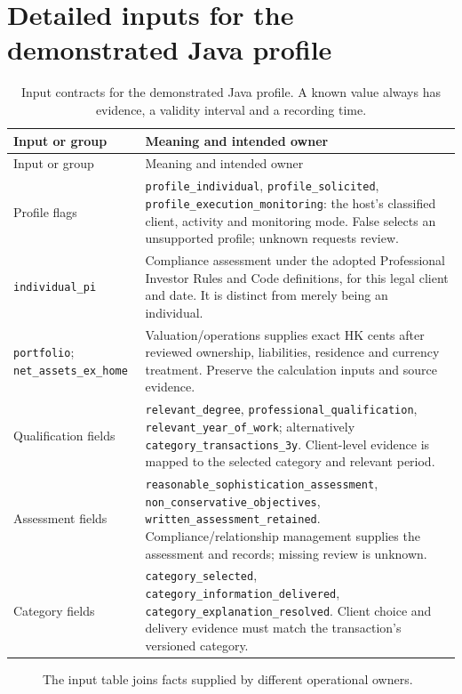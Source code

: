 \section{Detailed inputs for the demonstrated Java profile}
\begingroup\small
\begin{longtable}{P{0.30\textwidth}P{0.60\textwidth}}
\caption{Input contracts for the demonstrated Java profile. A known value always
has evidence, a validity interval and a recording time.}\label{tab:demo-inputs}\\
\toprule Input or group & Meaning and intended owner \\\midrule
\endfirsthead
\toprule Input or group & Meaning and intended owner \\\midrule
\endhead
Profile flags & \texttt{profile\_individual}, \texttt{profile\_solicited}, \texttt{profile\_execution\_monitoring}: the host's classified client, activity and monitoring mode. False selects an unsupported profile; unknown requests review.\\
\texttt{individual\_pi} & Compliance assessment under the adopted Professional Investor Rules and Code definitions, for this legal client and date. It is distinct from merely being an individual.\\
\texttt{portfolio}; \texttt{net\_assets\_ex\_home} & Valuation/operations supplies exact HK cents after reviewed ownership, liabilities, residence and currency treatment. Preserve the calculation inputs and source evidence.\\
Qualification fields & \texttt{relevant\_degree}, \texttt{professional\_qualification}, \texttt{relevant\_year\_of\_work}; alternatively \texttt{category\_transactions\_3y}. Client-level evidence is mapped to the selected category and relevant period.\\
Assessment fields & \texttt{reasonable\_sophistication\_assessment}, \texttt{non\_conservative\_objectives}, \texttt{written\_assessment\_retained}. Compliance/relationship management supplies the assessment and records; missing review is unknown.\\
Category fields & \texttt{category\_selected}, \texttt{category\_information\_delivered}, \texttt{category\_explanation\_resolved}. Client choice and delivery evidence must match the transaction's versioned category.\\
\bottomrule
\end{longtable}
\begingroup\normalsize
\begin{figure}[H]
\centering
{}
\caption{The input table joins facts supplied by different operational owners.}\label{fig:gap-spi-inputs}
\end{figure}

